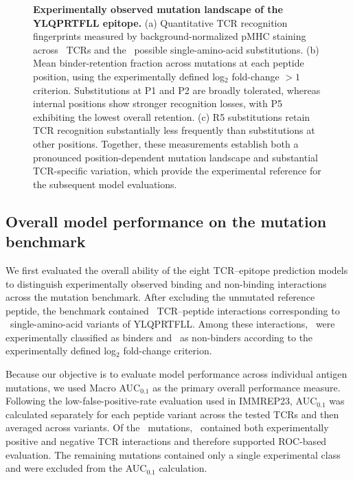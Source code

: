 \documentclass{article}
\begin{document}
\begin{figure}[!t]

\caption{
\textbf{Experimentally observed mutation landscape of the
YLQPRTFLL epitope.}
(a) Quantitative TCR recognition fingerprints measured by
background-normalized pMHC staining across \valNtcrs\ TCRs and the \valNmutations\
possible single-amino-acid substitutions.
(b) Mean binder-retention fraction across mutations at each peptide
position, using the experimentally defined log$_2$ fold-change
$>1$ criterion.
Substitutions at P1 and P2 are broadly tolerated, whereas internal
positions show stronger recognition losses, with P5 exhibiting the
lowest overall retention.
(c) R5 substitutions retain TCR recognition substantially less
frequently than substitutions at other positions.
Together, these measurements establish both a pronounced
position-dependent mutation landscape and substantial
TCR-specific variation, which provide the experimental reference
for the subsequent model evaluations.
}
\label{fig:experimental_landscape}

\end{figure}


\subsection{Overall model performance on the mutation benchmark}

We first evaluated the overall ability of the eight TCR--epitope prediction
models to distinguish experimentally observed binding and non-binding
interactions across the mutation benchmark. After excluding the unmutated
reference peptide, the benchmark contained \valNpairs\ TCR--peptide interactions
corresponding to \valNmutations\ single-amino-acid variants of YLQPRTFLL. Among these
interactions, \valNpositive\ were experimentally classified as binders and \valNnegative\ as
non-binders according to the experimentally defined log$_2$ fold-change
criterion.

Because our objective is to evaluate model performance across individual
antigen mutations, we used Macro AUC$_{0.1}$ as the primary overall
performance measure. Following the low-false-positive-rate evaluation used
in IMMREP23, AUC$_{0.1}$ was calculated separately for each peptide variant
across the tested TCRs and then averaged across variants. Of the \valNmutations\
mutations, \valNeligible\ contained both experimentally positive and negative TCR
interactions and therefore supported ROC-based evaluation. The remaining
mutations contained only a single experimental class and were excluded from
the AUC$_{0.1}$ calculation.
\end{document}
